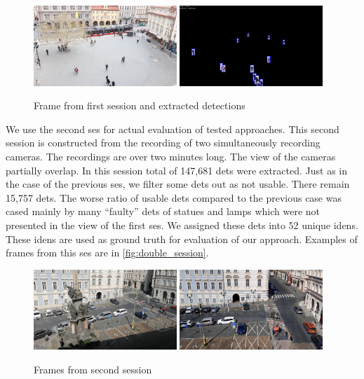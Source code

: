 \begin{figure}
    \centering
    \includegraphics[width=0.48\textwidth]{img/frame_single_session_smaller.png}
    \includegraphics[width=0.48\textwidth]{img/frame_single_session_det_smaller.png}
    \caption{Frame from first session and extracted detections}
    \label{fig:single_session}
\end{figure}

We use the second \gls{ses} for actual evaluation of tested approaches. This second session is constructed from the recording of two simultaneously recording cameras. The recordings are over two minutes long. The view of the cameras partially overlap. In this session total of 147,681 \glspl{det} were extracted. Just as in the case of the previous \gls{ses}, we filter some \glspl{det} out as not usable. There remain 15,757 \glspl{det}. The worse ratio of usable \glspl{det} compared to the previous case was cased mainly by many ``faulty'' \glspl{det} of statues and lamps which were not presented in the view of the first \gls{ses}. We assigned these \glspl{det} into 52 unique \glspl{iden}. These \glspl{iden} are used as ground truth for evaluation of our approach. Examples of frames from this \gls{ses} are in \autoref{fig:double_session}.

\begin{figure}
    \centering
    \includegraphics[width=0.48\textwidth]{img/frame_double_session_1_smaller.png}
    \includegraphics[width=0.48\textwidth]{img/frame_double_session_2_smaller.png}
    \caption{Frames from second session}
    \label{fig:double_session}
\end{figure}


